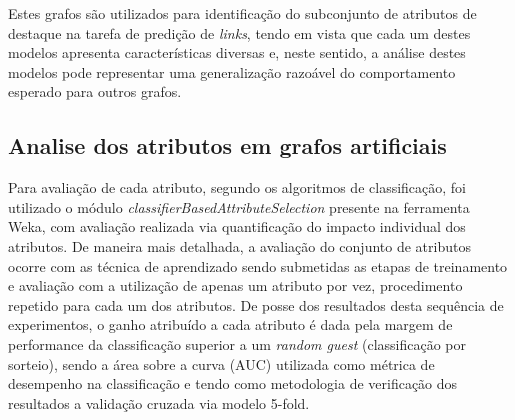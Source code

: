 \documentclass[a4paper,11pt]{article}
\begin{document}
Estes grafos são utilizados para identificação do subconjunto de atributos de destaque na tarefa de predição de \textit{links}, tendo em vista que cada um destes modelos apresenta características diversas e, neste sentido, a análise destes modelos pode representar uma generalização razoável do comportamento esperado para outros grafos. %








\vspace{0.3cm}
\subsection{Analise dos atributos em grafos artificiais}
\vspace{0.3cm}

Para avaliação de cada atributo, segundo os algoritmos de classificação, foi utilizado o módulo \textit{classifierBasedAttributeSelection} presente na ferramenta Weka, com avaliação realizada via quantificação do impacto individual dos atributos. De maneira mais detalhada, a avaliação do conjunto de atributos ocorre com as técnica de aprendizado sendo submetidas as etapas de treinamento e avaliação com a utilização de apenas um atributo por vez, procedimento repetido para cada um dos atributos. De posse dos resultados desta sequência de experimentos, o ganho atribuído a cada atributo é dada pela margem de performance da classificação superior a um \textit{random guest} (classificação por sorteio), sendo a área sobre a curva (AUC) utilizada como métrica de desempenho na classificação e tendo como metodologia de verificação dos resultados a validação cruzada via modelo 5-fold.

\end{document}
